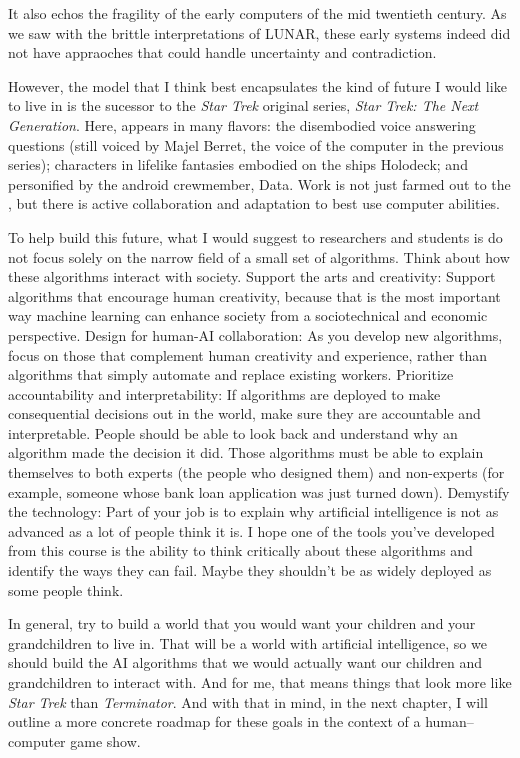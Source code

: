It also echos the fragility of the early computers of the mid twentieth century.
%
As we saw with the brittle interpretations of LUNAR, these early
systems indeed did not have appraoches that could handle uncertainty
and contradiction.

However, the model that I think best encapsulates the kind of 
future I would like to live in is the sucessor to the \textit{Star
  Trek} original series, \textit{Star Trek: The Next Generation}.
%
Here,  appears in many flavors: the disembodied voice
answering questions (still voiced by Majel Berret, the voice of the
computer in the previous series); characters in lifelike fantasies
embodied on the ships Holodeck; and personified by the android
crewmember, Data.
%
Work is not just farmed out to the , but there is active
collaboration and adaptation to best use computer abilities.



To help build this future, what I would suggest to researchers and
students is do not focus solely on the narrow field of a small set of
algorithms. Think about how these algorithms interact with society.
%
Support the arts and creativity: Support algorithms that encourage
human creativity, because that is the most important way machine
learning can enhance society from a sociotechnical and economic
perspective.
%
Design for human-AI collaboration: As you develop new algorithms,
focus on those that complement human creativity and experience, rather
than algorithms that simply automate and replace existing workers.
%
Prioritize accountability and interpretability: If algorithms are
deployed to make consequential decisions out in the world, make sure
they are accountable and interpretable. People should be able to look
back and understand why an algorithm made the decision it did. Those
algorithms must be able to explain themselves to both experts (the
people who designed them) and non-experts (for example, someone whose
bank loan application was just turned down).
%
Demystify the technology: Part of your job is to explain why
artificial intelligence is not as advanced as a lot of people think it
is. I hope one of the tools you've developed from this course is the
ability to think critically about these algorithms and identify the
ways they can fail. Maybe they shouldn't be as widely deployed as some
people think.

In general, try to build a world that you would want your children and
your grandchildren to live in. That will be a world with artificial
intelligence, so we should build the AI algorithms that we would
actually want our children and grandchildren to interact with.
%
And for me, that means things that look more like \textit{Star Trek}
than \textit{Terminator}.
%
And with that in mind, in the next chapter, I will outline a more
concrete roadmap for these goals in the context of a human--computer
game show.

